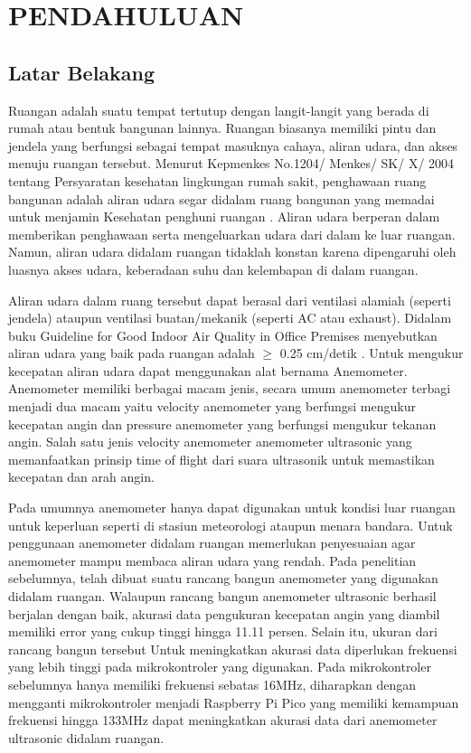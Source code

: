 \section{PENDAHULUAN}

\subsection{Latar Belakang}

Ruangan adalah suatu tempat tertutup dengan langit-langit yang berada di rumah atau bentuk bangunan lainnya. Ruangan biasanya memiliki pintu dan jendela yang berfungsi sebagai tempat masuknya cahaya, 
aliran udara, dan akses menuju ruangan tersebut. Menurut Kepmenkes No.1204/ Menkes/ SK/ X/ 2004 tentang Persyaratan kesehatan lingkungan rumah sakit, penghawaan ruang bangunan adalah aliran udara segar didalam ruang bangunan yang memadai untuk menjamin Kesehatan penghuni 
ruangan \parencites{menkes2004}. 
Aliran udara berperan dalam memberikan penghawaan serta mengeluarkan udara dari dalam ke luar ruangan. Namun, aliran udara didalam ruangan tidaklah konstan karena dipengaruhi 
oleh luasnya akses udara, keberadaan suhu dan kelembapan di dalam ruangan.

Aliran udara dalam ruang tersebut dapat berasal dari ventilasi alamiah (seperti jendela) ataupun ventilasi buatan/mekanik (seperti AC atau exhaust). Didalam buku Guideline for Good Indoor Air Quality in Office Premises menyebutkan 
aliran udara yang baik pada ruangan adalah $\geq$ 0.25 cm/detik \parencite{inst1996guide}.
Untuk mengukur kecepatan aliran udara dapat menggunakan alat bernama Anemometer. Anemometer memiliki berbagai macam jenis, secara umum anemometer terbagi menjadi dua macam yaitu velocity anemometer yang 
berfungsi mengukur kecepatan angin dan pressure anemometer yang berfungsi mengukur tekanan angin. Salah satu jenis velocity anemometer anemometer ultrasonic yang memanfaatkan prinsip time of flight dari suara ultrasonik untuk memastikan kecepatan dan arah angin.

Pada umumnya anemometer hanya dapat digunakan untuk kondisi luar ruangan untuk keperluan seperti di stasiun meteorologi ataupun menara bandara. 
Untuk penggunaan anemometer didalam ruangan memerlukan penyesuaian agar anemometer mampu membaca aliran udara yang rendah. 
Pada penelitian sebelumnya, telah dibuat suatu rancang bangun anemometer yang digunakan didalam ruangan. Walaupun rancang bangun anemometer ultrasonic berhasil berjalan dengan baik, akurasi data pengukuran kecepatan angin yang diambil memiliki error yang cukup 
tinggi hingga 11.11 persen. Selain itu, ukuran dari rancang bangun tersebut Untuk meningkatkan akurasi data diperlukan frekuensi yang lebih tinggi pada mikrokontroler yang digunakan. Pada mikrokontroler sebelumnya hanya memiliki frekuensi sebatas 16MHz, diharapkan dengan 
mengganti mikrokontroler menjadi Raspberry Pi Pico yang memiliki kemampuan frekuensi hingga 133MHz dapat meningkatkan akurasi data dari anemometer ultrasonic didalam ruangan.


